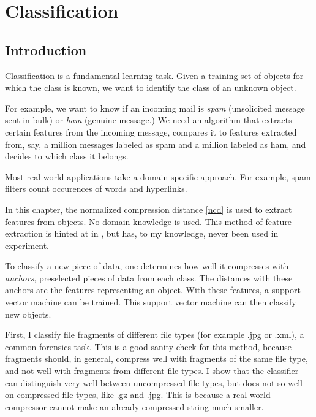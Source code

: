 
\chapter{Classification} %

\label{Chapter4} %


\section{Introduction}

Classification is a fundamental learning task. Given a training
set of objects for which the class is known, we want to identify the class
of an unknown object.

For example, we want to know if an incoming mail is \emph{spam}
(unsolicited message sent in bulk) or \emph{ham} (genuine message.) We
need an algorithm that extracts certain features from the incoming
message, compares it to features extracted from, say, a million messages
labeled as spam and a million labeled as ham, and decides to which class
it belongs.

Most real-world applications take a domain specific approach. For example, spam filters
count occurences of words and hyperlinks.

In this chapter, the normalized compression distance \eqref{ncd} is used
to extract features from objects. No domain knowledge is used. This method of feature extraction is hinted at in \cite{Cilibrasi2007}, but has, to my knowledge, never been used in experiment.

To classify a new piece of data, one determines how well it compresses with \emph{anchors}, preselected pieces of data from each class. The distances with these anchors are the features representing an object. With these features, a support vector machine can be trained. This support vector machine can then classify new objects.

First, I classify file fragments of different file types (for example .jpg or .xml), a common forensics task. This is a good sanity check for this method, because fragments should, in general, compress well with fragments of the same file type, and not well with fragments from different file types. I show that the classifier can distinguish very well between uncompressed file types, but does not so well on compressed file types, like .gz and .jpg. This is because a real-world compressor cannot make an already compressed string much smaller.

